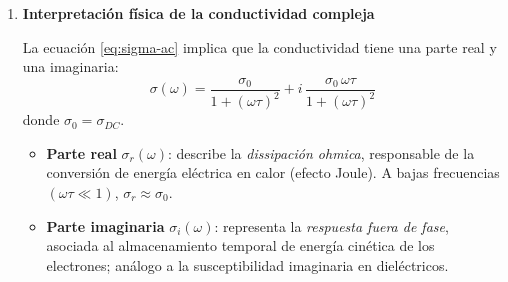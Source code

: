 \documentclass{article}
\begin{document}
\begin{enumerate}[label=\textbf{Actividad \arabic*.}, leftmargin=*]
En el modelo de Drude, la conductividad está dada por:
\begin{equation}
\sigma_{DC} = \frac{n e^2 \tau}{m}
\label{eq:sigma-dc}
\end{equation}
donde:
\begin{itemize}
    \item \(n\): densidad de electrones [\(\mathrm{m^{-3}}\)]
    \item \(e\): carga eléctrica [\(\mathrm{C}\)]
    \item \(\tau\): tiempo de relajación [\(\mathrm{s}\)]
    \item \(m\): masa del electrón [\(\mathrm{kg}\)]
\end{itemize}

\textbf{Análisis dimensional paso a paso:}
\[
[\sigma_{DC}] = \frac{[\mathrm{C}]^2 [\mathrm{s}]}{[\mathrm{kg}]\,[\mathrm{m^3}]}
\]
Sabemos que \(1~\mathrm{C} = 1~\mathrm{A\,s}\), así que:
\[
[\sigma_{DC}] = \frac{(\mathrm{A\,s})^2\,\mathrm{s}}{\mathrm{kg\,m^3}}
= \frac{\mathrm{A^2\,s^3}}{\mathrm{kg\,m^3}}
\]
y considerando la equivalencia de unidades de voltaje
\([V] = \mathrm{kg\,m^2\,s^{-3}\,A^{-1}}\),
entonces:
\[
[\sigma_{DC}] = \frac{\mathrm{A}}{\mathrm{V\,m}} = \mathrm{S/m}
\]
confirmando que la unidad correcta de conductividad en el SI es el \textbf{siemens por metro}.

\medskip
Para la conductividad alterna:
\begin{equation}
\sigma_{AC}(\omega) = \frac{n e^2}{m(1/\tau - i\omega)}
= \frac{\sigma_{DC}}{1 - i\omega\tau}
\label{eq:sigma-ac}
\end{equation}
el denominador es adimensional, de modo que \([\sigma_{AC}] = [\sigma_{DC}] = \mathrm{S/m}\).

\item \textbf{Interpretación física de la conductividad compleja}

La ecuación \eqref{eq:sigma-ac} implica que la conductividad tiene una parte real y una imaginaria:
\begin{equation}
\boxed{\sigma(\omega) = \frac{\sigma_{0}}{1+(\omega\tau)^2} + i\,\frac{\sigma_{0}\,\omega\tau}{1+(\omega\tau)^2}}
\label{eq:sigma-compleja}
\end{equation}
donde \(\sigma_{0} = \sigma_{DC}\).

\begin{itemize}
\item \textbf{Parte real} \(\sigma_r(\omega)\): describe la \emph{dissipación ohmica}, responsable de la conversión de energía eléctrica en calor (efecto Joule).  
A bajas frecuencias \((\omega\tau \ll 1)\), \(\sigma_r \approx \sigma_0\).
\item \textbf{Parte imaginaria} \(\sigma_i(\omega)\): representa la \emph{respuesta fuera de fase}, asociada al almacenamiento temporal de energía cinética de los electrones; análogo a la susceptibilidad imaginaria en dieléctricos.
\end{itemize}


\end{enumerate}
\end{document}

